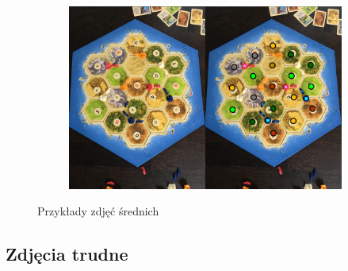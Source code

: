 \documentclass[a4paper]{article}
\begin{document}
\begin{figure}[H]
        
        \begin{subfigure}[]{\linewidth}
            \includegraphics[width=\linewidth]{pictures/results/result11.png}
        \end{subfigure}
        
        
        
        \caption{Przykłady zdjęć średnich}
        \label{fig:easy}
    \end{figure}
    
    \subsection{Zdjęcia trudne}
    
\end{document}
